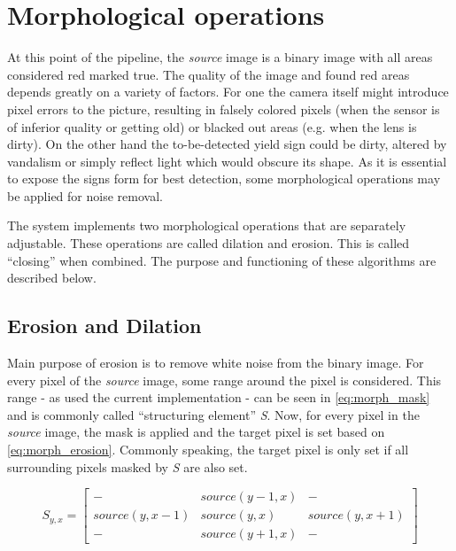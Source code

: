 \documentclass{report}
\begin{document}
\section{Morphological operations}
\label{sec:pipeline_morph}

At this point of the pipeline, the \textit{source} image is a binary
image with all areas considered red marked true. The quality of the
image and found red areas depends greatly on a variety of factors. For
one the camera itself might introduce pixel errors to the picture,
resulting in falsely colored pixels (when the sensor is of inferior
quality or getting old) or blacked out areas (e.g. when the lens is
dirty). On the other hand the to-be-detected yield sign could be
dirty, altered by vandalism or simply reflect light which would
obscure its shape. As it is essential to expose the signs form for
best detection, some morphological operations may be applied for noise
removal.

The system implements two morphological operations that are separately
adjustable. These operations are called dilation and erosion. This is
called ``closing'' when combined. The purpose and functioning of these
algorithms are described below.


\subsection{Erosion and Dilation}

Main purpose of erosion is to remove white noise from the binary
image. For every pixel of the \textit{source} image, some range around
the pixel is considered. This range - as used the current
implementation - can be seen in \ref{eq:morph_mask} and is commonly
called ``structuring element'' \textit{S}. Now, for every pixel in the
\textit{source} image, the mask is applied and the target pixel is set
based on \ref{eq:morph_erosion}. Commonly speaking, the target pixel
is only set if all surrounding pixels masked by \textit{S} are also
set.

\begin{equation}\label{eq:morph_mask}
  S_{y, x} = \begin{bmatrix}

    -              & source(y-1, x) & -              \\
    source(y, x-1) & source(y, x)   & source(y, x+1) \\
    -              & source(y+1, x) & -

  \end{bmatrix}
\end{equation}
\end{document}
